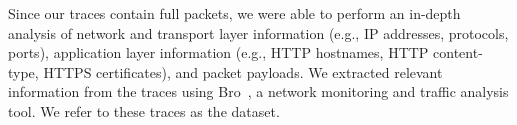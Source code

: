 Since our traces contain full packets, we were able to perform an
in-depth analysis of network and transport layer information (e.g., IP
addresses, protocols, ports), application layer information (e.g.,
HTTP hostnames, HTTP content-type, HTTPS certificates), and packet
payloads. We extracted relevant information from the traces using
Bro~\cite{paxson1998bro}, a network monitoring and traffic analysis
tool. We refer to these traces as the
\captureonedata dataset.



